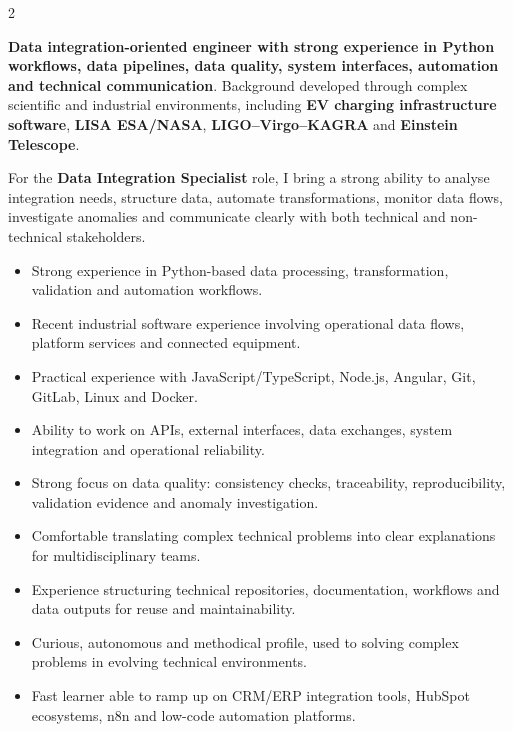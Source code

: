 \documentclass[8pt,a4paper,ragged2e,withhyper]{altacv}
\begin{document}
\begin{paracol}{2}
\switchcolumn


\textbf{Data integration-oriented engineer with strong experience in Python workflows, data pipelines, data quality, system interfaces, automation and technical communication}. Background developed through complex scientific and industrial environments, including \textbf{EV charging infrastructure software}, \textbf{LISA ESA/NASA}, \textbf{LIGO--Virgo--KAGRA} and \textbf{Einstein Telescope}.

For the \textbf{Data Integration Specialist} role, I bring a strong ability to analyse integration needs, structure data, automate transformations, monitor data flows, investigate anomalies and communicate clearly with both technical and non-technical stakeholders.

\begin{itemize}
  \item Strong experience in Python-based data processing, transformation, validation and automation workflows.
  \item Recent industrial software experience involving operational data flows, platform services and connected equipment.
  \item Practical experience with JavaScript/TypeScript, Node.js, Angular, Git, GitLab, Linux and Docker.
  \item Ability to work on APIs, external interfaces, data exchanges, system integration and operational reliability.
  \item Strong focus on data quality: consistency checks, traceability, reproducibility, validation evidence and anomaly investigation.
  \item Comfortable translating complex technical problems into clear explanations for multidisciplinary teams.
  \item Experience structuring technical repositories, documentation, workflows and data outputs for reuse and maintainability.
  \item Curious, autonomous and methodical profile, used to solving complex problems in evolving technical environments.
  \item Fast learner able to ramp up on CRM/ERP integration tools, HubSpot ecosystems, n8n and low-code automation platforms.
\end{itemize}


\divider
{}
\divider


\end{paracol}
\end{document}
